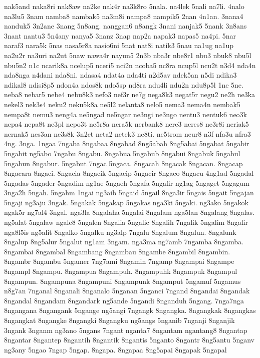 {nak5and naka8ri nak8aw na2ke nak4r na3k8ro 5nala. na4lek 5nali na7li.
4nalo na3lu5 3nam namba8 nambak5 na3m8i nampa8 nampik5 2nan 4n1an. 3nana4
nanduk5 3n2ane 3nang 5n8ang. nanggan6 n8angk 3nani nanjak5 5nank 3n8ans
3nant nantu3 5n4any nanya5 3nanz 3nap nap2a napak3 napas5 na4pi. 5nar
naraf3 nara5k 5nas nasa5r8a nasio6ni 5nat nat8i natik3 5nau na1ug na1up
na2u2r na3uri na2ut 5naw nawa4r nayun5 2n3b nba3r nbe8r1 nbu3 nbuk8 nbu5l
nbu5n2 n1c ncarik8a ncelup5 nceri5 nci2n ncoba5 nc8ra ncup5l ncu2t n3d4
nda4n nda8nga n4dani nda8ni. ndasa4 ndat4a nda4ti n2d5av ndek5an n5di
ndika3 ndikal8 ndisi8p5 ndon4a ndos8k ndo5sp nd8ra ndu4li ndu2n ndu8p5l
1ne 5ne. neba8 nebar5 nebe4 nebu8k3 nefo3 nef3r ne7g nega8k3 negat5r negu2
ne2h ne3ka nekel3 nek3s4 neku2 neku5k8a ne5l2 nelanta8 nelo5 nema3 nema4n
nembak5 nempa8t nemu3 neng4a ne5ngad ne5ngar ne3ngi ne3ngo nentu3 nentuk6
neo3k nepa4 nepa8t ne3pl nepo3t ne5r8a nera5k nerbank8 nere3 neres8 ne3r8i
neriak5 nernak5 nes3an ne3s8k 3n2et neta2 netek3 ne8ti. ne5trom neur8 n3f
nfa3u nfra3 4ng. 3nga. 1ngaa 7ngaba 8ngabaa 8ngabad 8ng5abah 8ng5abai
5ngabat 5ngabir 5ngabit ng5abo 7ngabu 8ngabu. 8ngabua 5ngabub 8ngabui
8ngabuk 5ngabul 5ngabun 8ngabur. 5ngabut 7ngac 5ngaca. 8ngacah 8ngacak
8ngacan. 8ngacap 8ngacara 8ngaci. 8ngacia 8ngacik 5ngacip 5ngacir 8ngaco
8ngacu 4ng1ad 5ngadal 5ngadas 5ngader 5ngadim ng1ae 5ngaeh 5ngafa 5ngafir
ng1ag 5ngaget 5ngagum 3nga2h 5ngah. 5ngahm 1ngai ng3aib 5ngaid 5ngail
8nga3ir 5ngais 5ngait 5ngajan 5ngaji ng3aju 3ngak. 5ngakak 5ngakap 5ngakas
nga3ki 5ngaki. ng3ako 5ngakok ngak5r ng7al4 3ngal. nga3la 8ngalaha 5ngalai
8ngalam nga5lan 8ngalang 8ngalas. ng5alat 5ngalaw ngale8 5ngalen 8ngalia
5ngalic 8ngalih 7ngalik 5ngalim 8ngalir nga8l5is ng5alit 8ngalko 5ngalku
ng3alp 7ngalu 8ngalum 8ngalun. 8ngalunk 8ngalup 8ng5alur 5ngalut ng1am
3ngam. nga3ma ng7amb 7ngamba 8ngamba. 8ngambai 8ngambal 8ngambang 8ngambau
8ngambe 8ngambil 8ngambin. 8ngambr 8ngambu 5ngamer 7ng7ami 8ngamin 7ngamp
8ngampai 8ngampe 8ngampl 8ngampu. 8ngampua 8ngampuh. 8ngampuhk 8ngampuk
8ngampul 8ngampun. 8ngampuna 8ngampuni 8ngampunk 8ngamput 5ngamuf 5ngamus
n8g7an 7nganal 8nganali 8nganalo 5nganan 5nganci 7ngand 8ngandai 8ngandak
8ngandal 8ngandam 8ngandark ng5ande 5ngandi 8nganduh 5ngang. 7nga7nga
8ngangana 8ngangank 5ngange ng5angi 7ngangk 8ngangka. 8ngangkak 8ngangkas
8ngangkat 8ngangke 8ngangki 8ngangku ng5angs 5nganib 7nganji 8nganjik
3ngank 3nganm ng3ano 5ngans 7ngant nganta7 8ngantam ngantang8 8ngantap
8ngantar 8ngantep 8ngantih 8ngantik 8ngantis 5nganto 8ngantr 8ng5antu
5nganv ng3any 5ngao 7ngap 5ngap. 8ngapa. 8ngapaa 8ng5apai 8ngapak 5ngapal
}
